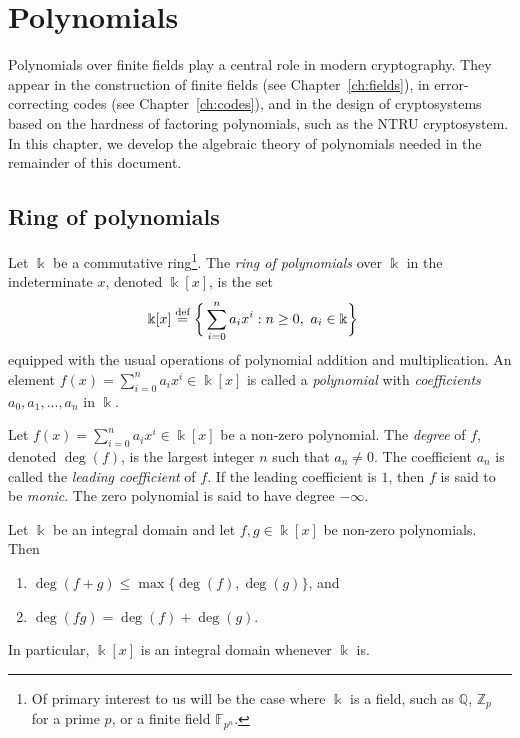 \documentclass[a4paper, 12pt]{book} %
\begin{document}
\chapter{Polynomials}

Polynomials over finite fields play a central role in modern cryptography.
They appear in the construction of finite fields (see Chapter~\ref{ch:fields}), in
error-correcting codes (see Chapter~\ref{ch:codes}), and in the design of
cryptosystems based on the hardness of factoring polynomials, such as the NTRU
cryptosystem. In this chapter, we develop the algebraic theory of polynomials
needed in the remainder of this document.

\section{Ring of polynomials}

\begin{definition}
    Let $\Bbbk$ be a commutative ring\footnote{Of primary interest to us will be the case where $\Bbbk$ is a field, such as $\mathbb{Q}$, $\mathbb{Z}_p$ for a prime $p$, or a finite field $\mathbb{F}_{p^n}$.}. The \emph{ring of polynomials} over $\Bbbk$ in the indeterminate $x$, denoted $\Bbbk[x]$, is the set
    \begin{align}
        \Bbbk[x] &\overset{\text{def}}{=} \bigg\{ \sum_{i=0}^{n} a_i x^i : n \geq 0, ~a_i \in \Bbbk \bigg\}
    \end{align}
    equipped with the usual operations of polynomial addition and multiplication. An element $f(x) = \sum_{i=0}^{n} a_i x^i \in \Bbbk[x]$ is called a \emph{polynomial} with \emph{coefficients} $a_0, a_1, \ldots, a_n$ in $\Bbbk$.
\end{definition}

\begin{definition}
    Let $f(x) = \sum_{i=0}^{n} a_i x^i \in \Bbbk[x]$ be a non-zero polynomial. The \emph{degree} of $f$, denoted $\deg(f)$, is the largest integer $n$ such that $a_n \neq 0$. The coefficient $a_n$ is called the \emph{leading coefficient} of $f$. If the leading coefficient is $1$, then $f$ is said to be \emph{monic}. The zero polynomial is said to have degree $-\infty$.
\end{definition}

\begin{proposition}
    Let $\Bbbk$ be an integral domain and let $f, g \in \Bbbk[x]$ be non-zero polynomials. Then
    \begin{enumerate}
        \item $\deg(f + g) \leq \max\{\deg(f), \deg(g)\}$, and
        \item $\deg(fg) = \deg(f) + \deg(g)$.
    \end{enumerate}
    In particular, $\Bbbk[x]$ is an integral domain whenever $\Bbbk$ is.
\end{proposition}
\end{document}
